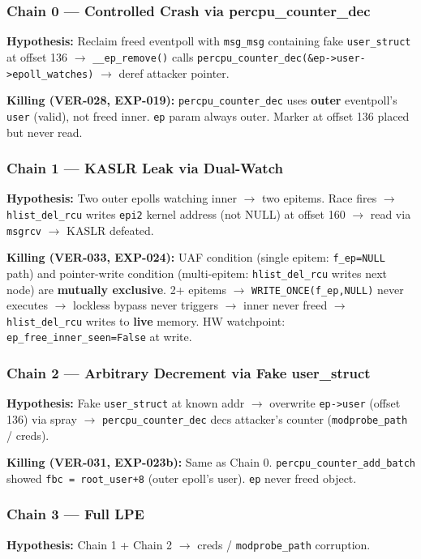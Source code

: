 \documentclass[11pt,a4paper]{article}
\newcommand{\inlinecode}[1]{\colorbox{codebg}{\ttfamily\small\color{keyword}#1}}
\begin{document}
\subsubsection{Chain 0 --- Controlled Crash via \inlinecode{percpu\_counter\_dec}}
\textbf{Hypothesis:} Reclaim freed eventpoll with \texttt{msg\_msg} containing fake \texttt{user\_struct} at offset 136 $\to$ \texttt{\_\_ep\_remove()} calls \texttt{percpu\_counter\_dec(\&ep->user->epoll\_watches)} $\to$ deref attacker pointer.

\textbf{Killing (VER-028, EXP-019):} \texttt{percpu\_counter\_dec} uses \textbf{outer} eventpoll's \texttt{user} (valid), not freed inner. \texttt{ep} param always outer. Marker at offset 136 placed but never read.

\subsubsection{Chain 1 --- KASLR Leak via Dual-Watch}
\textbf{Hypothesis:} Two outer epolls watching inner $\to$ two epitems. Race fires $\to$ \texttt{hlist\_del\_rcu} writes \texttt{epi2} kernel address (not NULL) at offset 160 $\to$ read via \texttt{msgrcv} $\to$ KASLR defeated.

\textbf{Killing (VER-033, EXP-024):} UAF condition (single epitem: \texttt{f\_ep=NULL} path) and pointer-write condition (multi-epitem: \texttt{hlist\_del\_rcu} writes next node) are \textbf{mutually exclusive}. 2+ epitems $\to$ \texttt{WRITE\_ONCE(f\_ep,NULL)} never executes $\to$ lockless bypass never triggers $\to$ inner never freed $\to$ \texttt{hlist\_del\_rcu} writes to \textbf{live} memory. HW watchpoint: \texttt{ep\_free\_inner\_seen=False} at write.

\subsubsection{Chain 2 --- Arbitrary Decrement via Fake \inlinecode{user\_struct}}
\textbf{Hypothesis:} Fake \texttt{user\_struct} at known addr $\to$ overwrite \texttt{ep->user} (offset 136) via spray $\to$ \texttt{percpu\_counter\_dec} decs attacker's counter (\texttt{modprobe\_path} / creds).

\textbf{Killing (VER-031, EXP-023b):} Same as Chain 0. \texttt{percpu\_counter\_add\_batch} showed \texttt{fbc = root\_user+8} (outer epoll's user). \texttt{ep} never freed object.

\subsubsection{Chain 3 --- Full LPE}
\textbf{Hypothesis:} Chain 1 + Chain 2 $\to$ creds / \texttt{modprobe\_path} corruption.
\end{document}
